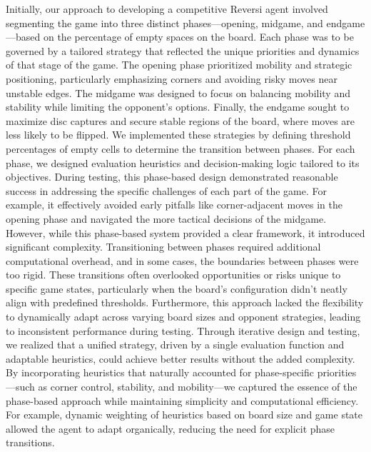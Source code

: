 \documentclass[11pt]{article}
\begin{document}
Initially, our approach to developing a competitive Reversi agent involved segmenting the game into three distinct phases—opening, midgame, and endgame—based on the percentage of empty spaces on the board. Each phase was to be governed by a tailored strategy that reflected the unique priorities and dynamics of that stage of the game. The opening phase prioritized mobility and strategic positioning, particularly emphasizing corners and avoiding risky moves near unstable edges. The midgame was designed to focus on balancing mobility and stability while limiting the opponent's options. Finally, the endgame sought to maximize disc captures and secure stable regions of the board, where moves are less likely to be flipped.
We implemented these strategies by defining threshold percentages of empty cells to determine the transition between phases. For each phase, we designed evaluation heuristics and decision-making logic tailored to its objectives. During testing, this phase-based design demonstrated reasonable success in addressing the specific challenges of each part of the game. For example, it effectively avoided early pitfalls like corner-adjacent moves in the opening phase and navigated the more tactical decisions of the midgame.
However, while this phase-based system provided a clear framework, it introduced significant complexity. Transitioning between phases required additional computational overhead, and in some cases, the boundaries between phases were too rigid. These transitions often overlooked opportunities or risks unique to specific game states, particularly when the board’s configuration didn't neatly align with predefined thresholds. Furthermore, this approach lacked the flexibility to dynamically adapt across varying board sizes and opponent strategies, leading to inconsistent performance during testing.
Through iterative design and testing, we realized that a unified strategy, driven by a single evaluation function and adaptable heuristics, could achieve better results without the added complexity. By incorporating heuristics that naturally accounted for phase-specific priorities—such as corner control, stability, and mobility—we captured the essence of the phase-based approach while maintaining simplicity and computational efficiency. For example, dynamic weighting of heuristics based on board size and game state allowed the agent to adapt organically, reducing the need for explicit phase transitions.
\end{document}
